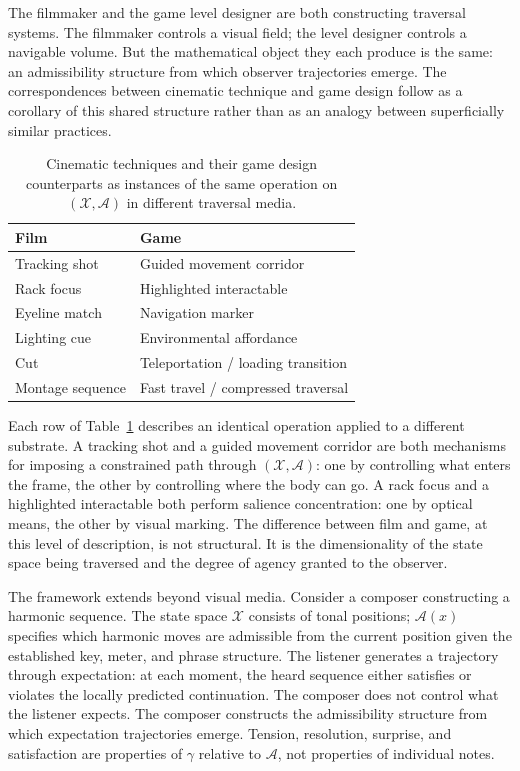 \documentclass[12pt, a4paper]{article}
\theoremstyle{plain}
\theoremstyle{definition}
\theoremstyle{remark}
\newcommand{\X}{\mathcal{X}}
\newcommand{\A}{\mathcal{A}}
\newcommand{\traj}{\gamma}
\begin{document}
The filmmaker and the game level designer are both
constructing traversal systems. The filmmaker controls a
visual field; the level designer controls a navigable volume.
But the mathematical object they each produce is the same:
an admissibility structure from which observer trajectories
emerge. The correspondences between cinematic technique and
game design follow as a corollary of this shared structure
rather than as an analogy between superficially similar
practices.

\begin{table}[h]
\centering
\begin{tabular}{ll}
\toprule
\textbf{Film} & \textbf{Game} \\
\midrule
Tracking shot       & Guided movement corridor \\
Rack focus          & Highlighted interactable \\
Eyeline match       & Navigation marker \\
Lighting cue        & Environmental affordance \\
Cut                 & Teleportation / loading transition \\
Montage sequence    & Fast travel / compressed traversal \\
\bottomrule
\end{tabular}
\caption{Cinematic techniques and their game design
  counterparts as instances of the same operation on
  $(\X, \A)$ in different traversal media.}
\label{tab:correspondences}
\end{table}

Each row of Table~\ref{tab:correspondences} describes an
identical operation applied to a different substrate. A
tracking shot and a guided movement corridor are both
mechanisms for imposing a constrained path through $(\X,
\A)$: one by controlling what enters the frame, the other by
controlling where the body can go. A rack focus and a
highlighted interactable both perform salience concentration:
one by optical means, the other by visual marking. The
difference between film and game, at this level of
description, is not structural. It is the dimensionality of
the state space being traversed and the degree of agency
granted to the observer.

The framework extends beyond visual media. Consider a
composer constructing a harmonic sequence. The state space
$\X$ consists of tonal positions; $\A(x)$ specifies which
harmonic moves are admissible from the current position given
the established key, meter, and phrase structure. The
listener generates a trajectory through expectation: at each
moment, the heard sequence either satisfies or violates the
locally predicted continuation. The composer does not control
what the listener expects. The composer constructs the
admissibility structure from which expectation trajectories
emerge. Tension, resolution, surprise, and satisfaction are
properties of $\traj$ relative to $\A$, not properties of
individual notes.
\end{document}
